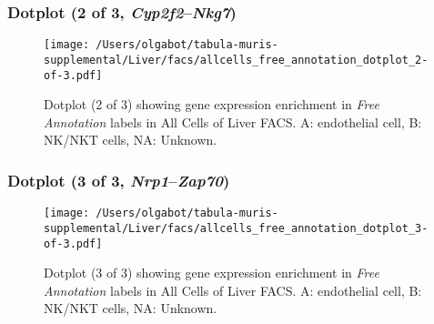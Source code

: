 \clearpage

\subsubsection{Dotplot (2 of 3, \emph{Cyp2f2}--\emph{Nkg7})}
\begin{figure}[h]
\centering
\texttt{[image: /Users/olgabot/tabula-muris-supplemental/Liver/facs/allcells\_free\_annotation\_dotplot\_2-of-3.pdf]}

\caption{ Dotplot (2 of 3)  showing gene expression enrichment in \emph{Free Annotation} labels in All Cells of Liver FACS. A: endothelial cell, B: NK/NKT cells, NA: Unknown.}
\end{figure}


\clearpage

\subsubsection{Dotplot (3 of 3, \emph{Nrp1}--\emph{Zap70})}
\begin{figure}[h]
\centering
\texttt{[image: /Users/olgabot/tabula-muris-supplemental/Liver/facs/allcells\_free\_annotation\_dotplot\_3-of-3.pdf]}

\caption{ Dotplot (3 of 3)  showing gene expression enrichment in \emph{Free Annotation} labels in All Cells of Liver FACS. A: endothelial cell, B: NK/NKT cells, NA: Unknown.}
\end{figure}

